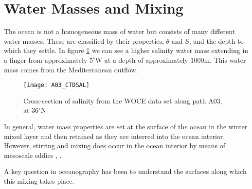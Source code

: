 \section{Water Masses and Mixing}
\label{section:lit_review_mixing}

The ocean is not a homogeneous mass of water but consists of many different water masses. These are classified by their properties, $\theta$ and $S$, and the depth to which they settle. In figure \ref{fig:salinitycrosssectionWOCE} we can see a higher salinity water mass extending in a finger from approximately $5^{\circ}$W at a depth of approximately 1000m. This water mass comes from the Mediterranean outflow. 

\begin{figure}[htbp]
    \centering
    \texttt{[image: A03\_CTDSAL]}
    \caption{Cross-section of salinity from the WOCE data set along path A03, at 36$^{\circ}$N \citep{WOCEAtlanticAtlas}}
    \label{fig:salinitycrosssectionWOCE}
\end{figure}

In general, water mass properties are set at the surface of the ocean in the winter mixed layer and then retained as they are interred into the ocean interior. However, stirring and mixing does occur in the ocean interior by means of mesoscale eddies \citep{Vallis2017}, \citep{OC4}. 

A key question in oceanography has been to understand the surfaces along which this mixing takes place. 